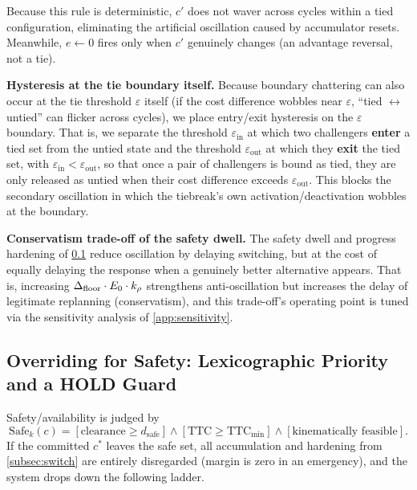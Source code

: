 Because this rule is deterministic, $c'$ does not waver across cycles within a tied configuration, eliminating the artificial oscillation caused by accumulator resets. Meanwhile, $e \leftarrow 0$ fires only when $c'$ genuinely changes (an advantage reversal, not a tie).

\noindent\textbf{Hysteresis at the tie boundary itself.} Because boundary chattering can also occur at the tie threshold $\varepsilon$ itself (if the cost difference wobbles near $\varepsilon$, ``tied $\leftrightarrow$ untied'' can flicker across cycles), we place entry/exit hysteresis on the $\varepsilon$ boundary. That is, we separate the threshold $\varepsilon_{\text{in}}$ at which two challengers \textbf{enter} a tied set from the untied state and the threshold $\varepsilon_{\text{out}}$ at which they \textbf{exit} the tied set, with $\varepsilon_{\text{in}} < \varepsilon_{\text{out}}$, so that once a pair of challengers is bound as tied, they are only released as untied when their cost difference exceeds $\varepsilon_{\text{out}}$. This blocks the secondary oscillation in which the tiebreak's own activation/deactivation wobbles at the boundary.

\noindent\textbf{Conservatism trade-off of the safety dwell.} The safety dwell and progress hardening of \cref{subsec:safety} reduce oscillation by delaying switching, but at the cost of equally delaying the response when a genuinely better alternative appears. That is, increasing $\Delta_{\text{floor}} \cdot E_0 \cdot k_\rho$ strengthens anti-oscillation but increases the delay of legitimate replanning (conservatism), and this trade-off's operating point is tuned via the sensitivity analysis of \cref{app:sensitivity}.


\subsection{Overriding for Safety: Lexicographic Priority and a HOLD Guard}\label{subsec:safety}

Safety/availability is judged by
\begin{equation}
\mathrm{Safe}_k(c) = [\text{clearance} \ge d_{\text{safe}}] \wedge [\text{TTC} \ge \text{TTC}_{\min}] \wedge [\text{kinematically feasible}].
\label{eq:safe}
\end{equation}
If the committed $c^*$ leaves the safe set, all accumulation and hardening from \cref{subsec:switch} are entirely disregarded (margin is zero in an emergency), and the system drops down the following ladder.

